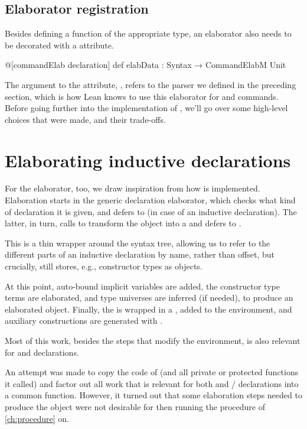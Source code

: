 \subsection*{Elaborator registration}
Besides defining a function of the appropriate type, an elaborator also needs to be decorated with a  attribute.

\begin{leancode}
  @[commandElab declaration] def elabData : Syntax → CommandElabM Unit
\end{leancode}

The argument to the attribute, , refers to the parser we defined in the preceding section, which is how Lean knows to use this elaborator for \data{} and \codata{} commands.
Before going further into the implementation of , we'll go over some high-level choices 
that were made, and their trade-offs.


\section{Elaborating inductive declarations}
For the elaborator, too, we draw inspiration from how \inductive{} is implemented.
Elaboration starts in the generic declaration elaborator, which checks what kind of declaration it is given, and defers to  (in case of an inductive declaration). The latter, in turn, calls  to transform the  object into a  and defers to .

This  is a thin wrapper around the syntax tree, allowing us to refer to the different parts of an inductive declaration by name, rather than offset, but crucially, still stores, e.g., constructor types as  objects.

At this point, auto-bound implicit variables are added, the constructor type terms are elaborated, and type universes are inferred (if needed), to produce an elaborated  object. 
Finally, the  is wrapped in a , added to the environment, and auxiliary constructions are generated with .


Most of this work, besides the steps that modify the environment, is also relevant for \data{} and \codata{} declarations.

An attempt was made to copy the code of  (and all private or protected functions it called) and factor out all work that is relevant for both \inductive{} and \data{}/\codata{} declarations into a common function.
However, it turned out that some elaboration steps needed to produce the  object were not desirable for then running the procedure of \cref{ch:procedure} on.

